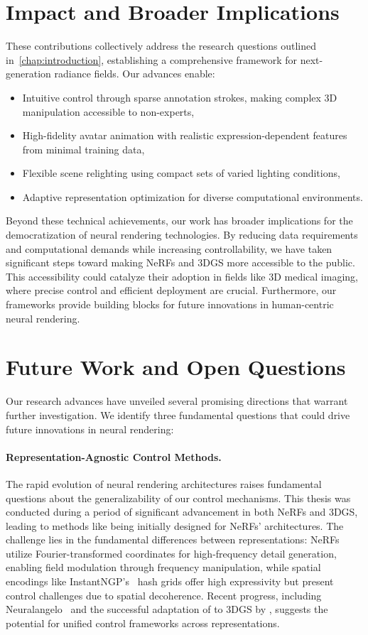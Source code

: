 \section{Impact and Broader Implications}
  These contributions collectively address the research questions outlined
  in~\cref{chap:introduction}, establishing a comprehensive framework for
  next-generation radiance fields.
  Our advances enable:
  \begin{itemize}
    \item Intuitive control through sparse annotation strokes, making complex 3D manipulation accessible to non-experts,
    \item High-fidelity avatar animation with realistic expression-dependent features from minimal training data,
    \item Flexible scene relighting using compact sets of varied lighting conditions,
    \item Adaptive representation optimization for diverse computational environments.
  \end{itemize}
  Beyond these technical achievements, our work has broader implications for the
  democratization of neural rendering technologies.
  By reducing data requirements and computational demands while increasing
  controllability, we have taken significant steps toward making NeRFs and 3DGS
  more accessible to the public.
  This accessibility could catalyze their adoption in fields like 3D medical
  imaging, where precise control and efficient deployment are crucial.
  Furthermore, our frameworks provide building blocks for future innovations in
  human-centric neural rendering.

\section{Future Work and Open Questions}
  Our research advances have unveiled several promising directions that warrant
  further investigation.
  We identify three fundamental questions that could drive future innovations in
  neural rendering:

  \paragraph{Representation-Agnostic
    Control Methods.
  }
  The rapid evolution of neural rendering architectures raises fundamental
  questions about the generalizability of our control mechanisms.
  This thesis was conducted during a period of significant advancement in both
  NeRFs and 3DGS, leading to methods like \conerf being initially designed for
  NeRFs' architectures.
  The challenge lies in the fundamental differences between representations:
  NeRFs utilize Fourier-transformed coordinates for high-frequency detail
  generation, enabling field modulation through frequency manipulation, while
  spatial encodings like InstantNGP's~\cite{mueller2022instant} hash grids offer
  high expressivity but present control challenges due to spatial decoherence.
  Recent progress, including Neuralangelo~\cite{li2023neuralangelo} and the
  successful adaptation of \conerf to 3DGS by \textcite{yu2024cogs}, suggests
  the potential for unified control frameworks across representations.

